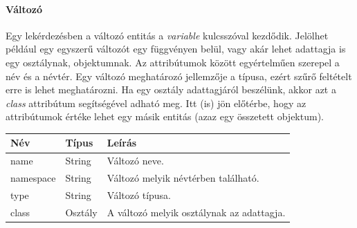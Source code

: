 \documentclass[a4paper,12pt]{report}
\begin{document}
\paragraph{Változó}
Egy lekérdezésben a változó entitás a \textit{variable} kulcsszóval kezdődik. Jelölhet például egy egyszerű változót egy függvényen belül, vagy akár lehet adattagja is egy osztálynak, objektumnak. Az attribútumok között egyértelműen szerepel a név és a névtér. Egy változó meghatározó jellemzője a típusa, ezért szűrő feltételt erre is lehet meghatározni. Ha egy osztály adattagjáról beszélünk, akkor azt a \textit{class} attribútum segítségével adható meg. Itt (is) jön előtérbe, hogy az attribútumok értéke lehet egy másik entitás (azaz egy összetett objektum).
\begin{center}
	\begin{tabular}{| l | l | l |}
		\hline
		Név & Típus & Leírás \\ \hline
		name & String & Változó neve. \\ \hline
		namespace & String & Változó melyik névtérben található. \\ \hline
		type & String & Változó típusa. \\ \hline
		class & Osztály & A változó melyik osztálynak az adattagja. \\ \hline
	\end{tabular}
\end{center}
\end{document}
